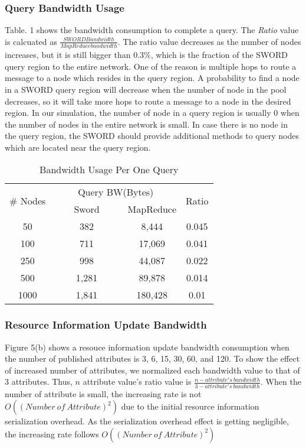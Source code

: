 \documentclass{acm_proc_article-sp}
\begin{document}
\subsubsection{Query Bandwidth Usage}
Table. 1 shows the bandwidth consumption to complete a query. The \textit{Ratio} value is calcuated as \begin{math}\frac{SWORD Bandwidth}{MapReduce bandwidth}\end{math}. The ratio value decreases as the number of nodes
increases, but it is still bigger than 0.3\%, which is the fraction of the SWORD query region to the entire network. One of the reason is multiple hops to route a message to a node which resides in the query region.
A probability to find a node in a SWORD query region will decrease when the number of node in the pool decreases, so it will take more hops to route a message to a node in the desired region. 
In our simulation, the number of node in a query region is usually 0 when the number of nodes in the entire network is small. 
In case there is no node in the query region, the SWORD should provide additional methods to query nodes which are located near the query region.
\begin{table}
\centering
\caption{Bandwidth Usage Per One Query}
\begin{center}
\begin{tabular}{|c|c|c|c|} \hline
\multirow{2}{*}{\# Nodes}&\multicolumn{2}{|c|}{Query BW(Bytes)}&\multirow{2}{*}{Ratio} \\ \cline{2-3}
\ &\ \ \ \ Sword\ \ \ \ &MapReduce& \\ \hline\hline
50&382&8,444&0.045\\ \hline
100&711&17,069&0.041\\ \hline
250&998&44,087&0.022\\ \hline
500&1,281&89,878&0.014\\ \hline
1000&1,841&180,428&0.01\\ \hline
\end{tabular}
\end{center}
\end{table}
\subsubsection{Resource Information Update Bandwidth}
Figure 5(b) shows a resouce information update bandwidth consumption when the number of published attributes is 3, 6, 15, 30, 60, and 120. 
To show the effect of increased number of attributes, we normalized each bandwidth value to that of 3 attributes.
Thus, $n$ attribute value's ratio value is \begin{math}\frac{n-attribute's\ bandwidth}{3-attribute's\ bandwidth}\end{math}. 
When the number of attribute is small, the increasing rate is not $O((Number\ of\ Attribute)^2)$ due to the initial resource information serialization overhead.
As the serialization overhead effect is getting negligible, the increasing rate follows $O((Number\ of\ Attribute)^2)$
\end{document}
